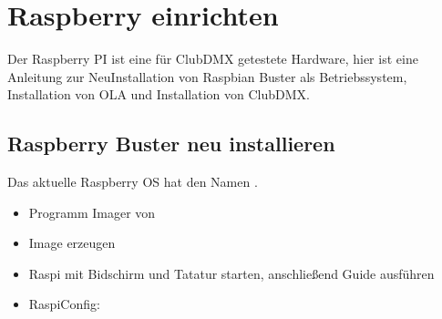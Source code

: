 \documentclass[letterpaper,10pt,ngerman]{sphinxmanual}
\begin{document}
\noindent{}


\chapter{Raspberry einrichten}
\label{\detokenize{raspberry:raspberry-einrichten}}\label{\detokenize{raspberry:raspberry-label}}\label{\detokenize{raspberry::doc}}
Der Raspberry PI ist eine für ClubDMX getestete Hardware, hier ist
eine Anleitung zur Neu\sphinxhyphen{}Installation von Raspbian Buster als Betriebssystem,
Installation von OLA und Installation von ClubDMX.


\section{Raspberry Buster neu installieren}
\label{\detokenize{raspberry:raspberry-buster-neu-installieren}}\label{\detokenize{raspberry:buster}}
Das aktuelle Raspberry OS hat den Namen .
\begin{itemize}
\item {} 
Programm Imager von 

\item {} 
Image erzeugen

\item {} 
Raspi mit Bidschirm und Tatatur starten, anschließend Guide ausführen

\item {} 
Raspi\sphinxhyphen{}Config:

\end{itemize}

\begin{sphinxVerbatim}[commandchars=\\\{\}]
 
  

  

  

  

  
\end{sphinxVerbatim}
\end{document}
